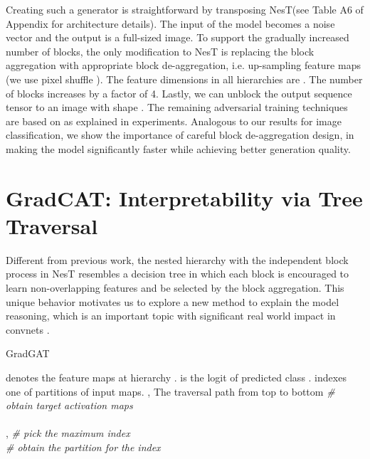 \documentclass{article}
\newcommand{\OURS}{NesT\xspace}
\begin{document}
Creating such a generator is straightforward by transposing \OURS (see Table A6 of Appendix for architecture details).  
The input of the model becomes a noise vector and the output is a full-sized image. 
To support the gradually increased number of blocks, the only modification to \OURS is replacing the block aggregation with appropriate block de-aggregation, i.e. up-sampling feature maps (we use pixel shuffle \cite{shi2016real}).
The feature dimensions in all hierarchies are . 
The number of blocks increases by a factor of 4. 
Lastly, we can unblock the output sequence tensor to an image with shape . 
The remaining adversarial training techniques are based on  \cite{goodfellow2014generative,zhang2019self} as explained in experiments.
Analogous to our results for image classification, we show the importance of careful block de-aggregation design, in making the model significantly faster while achieving better generation quality. 



\section{GradCAT: Interpretability via Tree Traversal}

Different from previous work, the nested hierarchy with the independent block process in \OURS resembles a decision tree in which each block is encouraged to learn non-overlapping features and be selected by the block aggregation. 
This unique behavior motivates us to explore a new method to explain the model reasoning, which is an important topic with significant real world impact in convnets \cite{selvaraju2017grad,sundararajan2017axiomatic}.

\setcounter{algorithm}{0} \begin{algorithm}[h]
\small
   \caption{\small GradGAT }
   \label{alg:gat}
\begin{algorithmic}
      denotes the feature maps at hierarchy .  is the logit of predicted class . 
    indexes one of  partitions of input maps.
    , 
    The traversal path  from top to bottom
    \FOR{} 
        \STATE  \hspace*{0pt}\hfill \textit{\# obtain target activation maps} \\
        \STATE  \hspace*{0pt}\hfill  \\
        \STATE , \;  \hspace*{0pt}\hfill  \textit{\# pick the maximum index} \\
        \STATE  \hspace*{0pt}\hfill  \textit{\# obtain the partition for the index}
   \ENDFOR
\end{algorithmic}
\end{algorithm}
\end{document}
